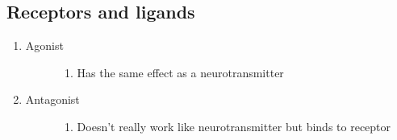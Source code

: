 \documentclass[letterpaper,10pt,english]{sphinxmanual}
\begin{document}
\subsection{Receptors and ligands}
\label{\detokenize{neuroscience/biology:receptors-and-ligands}}\begin{enumerate}
\item {} \begin{description}
\item[{Agonist}] \leavevmode\begin{enumerate}
\item {} 
Has the same effect as a neurotransmitter

\end{enumerate}

\end{description}

\item {} \begin{description}
\item[{Antagonist}] \leavevmode\begin{enumerate}
\item {} 
Doesn’t really work like neurotransmitter but binds to receptor

\end{enumerate}

\end{description}

\end{enumerate}
\end{document}
